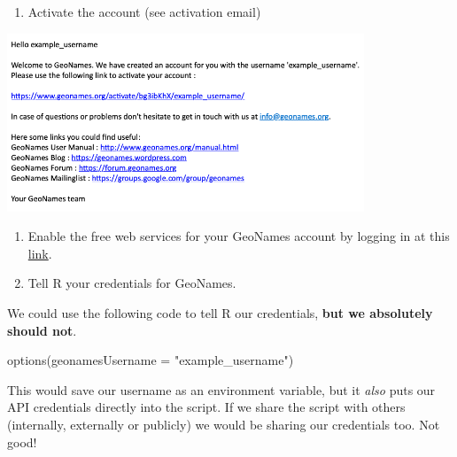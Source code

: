 \documentclass[
  letterpaper,
  DIV=11,
  numbers=noendperiod]{scrreprt}
\newenvironment{Shaded}{\begin{snugshade}}{\end{snugshade}}
\newcommand{\AttributeTok}[1]{\textcolor[rgb]{0.40,0.45,0.13}{#1}}
\newcommand{\FunctionTok}[1]{\textcolor[rgb]{0.28,0.35,0.67}{#1}}
\newcommand{\NormalTok}[1]{\textcolor[rgb]{0.00,0.23,0.31}{#1}}
\newcommand{\StringTok}[1]{\textcolor[rgb]{0.13,0.47,0.30}{#1}}
\providecommand{\tightlist}{%
  \setlength{\itemsep}{0pt}\setlength{\parskip}{0pt}}\usepackage{longtable,booktabs,array}
\begin{document}
\begin{enumerate}
\def\labelenumi{\arabic{enumi}.}
\setcounter{enumi}{2}
\tightlist
\item
  Activate the account (see activation email)
\end{enumerate}

\begin{center}
\includegraphics[width=0.8\textwidth,height=\textheight]{images/203-data-apis/confirmation-email.png}
\end{center}

\begin{enumerate}
\def\labelenumi{\arabic{enumi}.}
\setcounter{enumi}{3}
\item
  Enable the free web services for your GeoNames account by logging in
  at this \href{http://www.geonames.org/enablefreewebservice}{link}.
\item
  Tell R your credentials for GeoNames.
\end{enumerate}

\begin{tcolorbox}[enhanced jigsaw, coltitle=black, opacityback=0, left=2mm, titlerule=0mm, breakable, colback=white, opacitybacktitle=0.6, colbacktitle=quarto-callout-warning-color!10!white, bottomtitle=1mm, toptitle=1mm, colframe=quarto-callout-warning-color-frame, bottomrule=.15mm, leftrule=.75mm, title=\textcolor{quarto-callout-warning-color}{\faExclamationTriangle}\hspace{0.5em}{Warning}, toprule=.15mm, arc=.35mm, rightrule=.15mm]

We could use the following code to tell R our credentials, \textbf{but
we absolutely should not}.

\begin{Shaded}
\begin{Highlighting}[]
\FunctionTok{options}\NormalTok{(}\AttributeTok{geonamesUsername =} \StringTok{"example\_username"}\NormalTok{)}
\end{Highlighting}
\end{Shaded}

This would save our username as an environment variable, but it
\emph{also} puts our API credentials directly into the script. If we
share the script with others (internally, externally or publicly) we
would be sharing our credentials too. Not good!

\end{tcolorbox}
\end{document}
